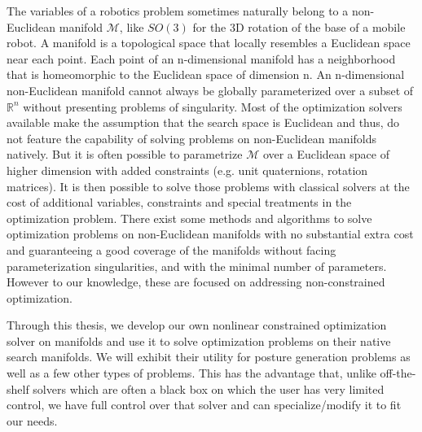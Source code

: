 The variables of a robotics problem sometimes naturally belong to a non-Euclidean manifold $\mathcal{M}$, like $SO(3)$ for the 3D rotation of the base of a mobile robot.
A manifold is a topological space that locally resembles a Euclidean space near each point.
Each point of an n-dimensional manifold has a neighborhood that is homeomorphic to the Euclidean space of dimension n.
An n-dimensional non-Euclidean manifold cannot always be globally parameterized over a subset of $\mathbb{R}^n$ without presenting problems of singularity.
Most of the optimization solvers available make the assumption that the search space is Euclidean and thus, do not feature the capability of solving problems on non-Euclidean manifolds natively.
But it is often possible to parametrize $\mathcal{M}$ over a Euclidean space of higher dimension with added constraints (e.g. unit quaternions, rotation matrices).
It is then possible to solve those problems with classical solvers at the cost of additional variables, constraints and special treatments in the optimization problem.
There exist some methods and algorithms to solve optimization problems on non-Euclidean manifolds with no substantial extra cost and guaranteeing a good coverage of the manifolds without facing parameterization singularities, and with the minimal number of parameters. However to our knowledge, these are focused on addressing non-constrained optimization.

Through this thesis, we develop our own nonlinear constrained optimization solver on manifolds and use it to solve optimization problems on their native search manifolds. We will exhibit their utility for posture generation problems as well as a few other types of problems.
This has the advantage that, unlike off-the-shelf solvers which are often a black box on which the user has very limited control, we have full control over that solver and can specialize/modify it to fit our needs.


